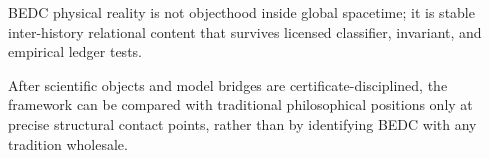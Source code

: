 \begin{corollary}
\label{cor:philosophy-physical-reality-stable-relation}
BEDC physical reality is not objecthood inside global spacetime; it is
stable inter-history relational content that survives licensed
classifier, invariant, and empirical ledger tests.
\end{corollary}

\begin{corollary}
\label{cor:philosophy-passage-to-traditions}
After scientific objects and model bridges are certificate-disciplined,
the framework can be compared with traditional philosophical positions
only at precise structural contact points, rather than by identifying
BEDC with any tradition wholesale.
\end{corollary}
